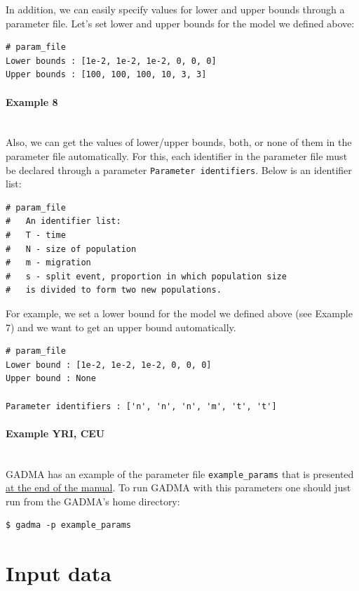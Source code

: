 \documentclass[12pt]{article}
\makeatletter
\newcommand{\py}[1]{\lstinline[language=Python, showstringspaces=False]@#1@}
\makeatother
\begin{document}
In addition, we can easily specify values for lower and upper bounds through a parameter file. Let's set lower and upper bounds for the model we defined above:

\begin{lstlisting}
# param_file
Lower bounds : [1e-2, 1e-2, 1e-2, 0, 0, 0]
Upper bounds : [100, 100, 100, 10, 3, 3]
\end{lstlisting}

\paragraph{Example 8}\mbox{}\\
Also, we can get the values of lower/upper bounds, both, or none of them in the parameter file automatically. For this, each identifier in the parameter file must be declared through a parameter \py{Parameter identifiers}. Below is an identifier list:

\begin{lstlisting}
# param_file
#   An identifier list:
#   T - time
#   N - size of population
#   m - migration
#   s - split event, proportion in which population size
#   is divided to form two new populations.
\end{lstlisting}

For example, we set a lower bound for the model we defined above (see Example 7) and we want to get an upper bound automatically.

\begin{lstlisting}
# param_file
Lower bound : [1e-2, 1e-2, 1e-2, 0, 0, 0]
Upper bound : None

Parameter identifiers : ['n', 'n', 'n', 'm', 't', 't']
\end{lstlisting}

\paragraph{Example YRI, CEU}\mbox{}\\
GADMA has an example of the parameter file \py{example_params} that is presented \hyperref[sec:example-params]{at the end of the manual}. To run GADMA with this parameters one should just run from the GADMA's home directory:
\begin{lstlisting}
$ gadma -p example_params
\end{lstlisting}


\section{Input data}
\end{document}
